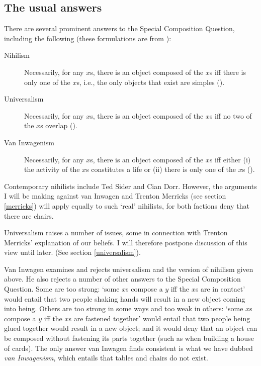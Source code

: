\documentclass[11pt]{article}
\begin{document}
\begin{spacing}{1.5}
\subsection{The usual answers}
\label{scq-ans}
There are several prominent answers to the Special Composition
Question, including the following (these formulations are from
\citet{markosian1998a}):
\begin{description}
	\item[Nihilism] Necessarily, for any $x$s, there is an object
          composed of the $x$s iff there is only one of the $x$s,
          i.e., the only objects that exist are
          simples (\citeyear[219]{markosian1998a}).%
	\item[Universalism] Necessarily, for any $x$s, there is an
          object composed of the $x$s iff no two of the $x$s overlap
          (\citeyear[227]{markosian1998a}).
	\item[Van Inwagenism] Necessarily, for any $x$s, there is an
          object composed of the $x$s iff either (i) the activity of
          the $x$s constitutes a life or (ii) there is only one of the
          $x$s (\citeyear[221]{markosian1998a}).
\end{description}

Contemporary nihilists include Ted Sider and Cian Dorr.  However, the
arguments I will be making against van Inwagen and Trenton Merricks
(see section \ref{merricks}) will apply equally to such `real'
nihilists, for both factions deny that there are chairs.

Universalism raises a number of issues, some in connection with
Trenton Merricks' explanation of our beliefs.  I will therefore
postpone discussion of this view until later.  (See section
\ref{universalism}).

Van Inwagen examines and rejects universalism and the version of
nihilism given above.  He also rejects a number of other answers to
the Special Composition Question.  Some are too strong: `some $x$s
compose a $y$ iff the $x$s are in contact' would entail that two
people shaking hands will result in a new object coming into being.
Others are too strong in some ways and too weak in others: `some $x$s
compose a $y$ iff the $x$s are fastened together' would entail that
two people being glued together would result in a new object; and it
would deny that an object can be composed without fastening its parts
together (such as when building a house of cards).  The only answer
van Inwagen finds consistent is what we have dubbed {\em van
  Inwagenism}, which entails that tables and chairs do not exist.


\end{spacing}
\end{document}
